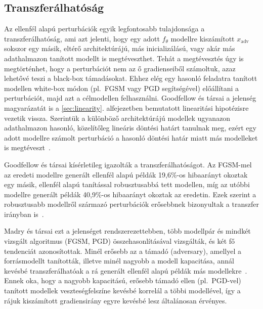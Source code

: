 \subsection{Transzferálhatóság}
Az ellenfél alapú perturbációk egyik legfontosabb tulajdonsága a transzferálhatóság, ami azt jelenti, hogy egy adott $f_\theta$ 
modellre kiszámított $x_{\mathrm{adv}}$ sokszor egy másik, eltérő architektúrájú, más inicializálású, vagy akár más adathalmazon 
tanított modellt is megtéveszthet. 
Tehát a megtévesztés úgy is megtörténhet, hogy a perturbációt nem az ő gradienseiből számoltuk, azaz lehetővé teszi a black-box 
támadásokat. 
Ehhez elég egy hasonló feladatra tanított modellen white-box módon (pl.\ FGSM vagy PGD segítségével) előállítani a perturbációt, 
majd azt a célmodellen felhasználni. 
Goodfellow és társai a jelenség magyarázatát is a \ref{sec:linearity}. alfejezetben bemutatott linearitási hipotézisre vezetik 
vissza. 
Szerintük a különböző architektúrájú modellek ugyanazon adathalmazon hasonló, közelítőleg lineáris döntési határt tanulnak meg, 
ezért egy adott modellre számolt perturbáció a hasonló döntési határ miatt más modelleket is 
megtéveszt~\cite{goodfellow2015explaining}. 

Goodfellow és társai kísérletileg igazolták a transzferálhatóságot. 
Az FGSM-mel az eredeti modellre generált ellenfél alapú példák 19,6\%-os hibaarányt okoztak egy másik, ellenfél alapú tanítással 
robusztusabbá tett modellen, míg az utóbbi modellre generált példák 40,9\%-os hibaarányt okoztak az eredetin. 
Ezek szerint a robusztusabb modellről származó perturbációk erősebbnek bizonyultak a transzfer irányban 
is~\cite{goodfellow2015explaining}. 

Madry és társai ezt a jelenséget rendszerezettebben, több modellpár és mindkét vizsgált algoritmus (FGSM, PGD) 
összehasonlításával vizsgálták, és két fő tendenciát azonosítottak. 
Minél erősebb az a támadó (adversary), amellyel a forrásmodellt tanították, illetve minél nagyobb a modell kapacitása, annál 
kevésbé transzferálhatóak a rá generált ellenfél alapú példák más modellekre~\cite{madry2018towards}. 
Ennek oka, hogy a nagyobb kapacitású, erősebb támadó ellen (pl.\ PGD-vel) tanított modellek veszteségfelszíne kevésbé korrelál a 
többi modellével, így a rájuk kiszámított gradiensirány egyre kevésbé lesz általánosan érvényes. 


